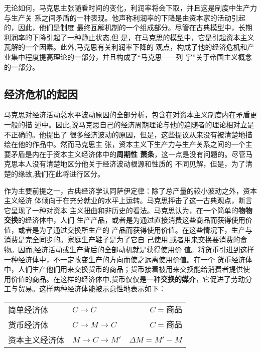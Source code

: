 无论如何，马克思主张随看时间的变化，利润率将会下取，并且这是制度中生产力与生产关
系之间矛盾的一种表现。他声称利润率的下降是由资本家的活动引起的，因此，他们是制度
最终瓦解机制的一个组成部分。尽管在古典模型中，长期利润率的下降引起了一种静止状态,但
是，在马克思的模型中，它是引起资本主义瓦解的一个因素。此外,马克思有关利润率下降的
观点，构成了他的经济危机和产业集中程度提高理论的一部分，并且构成了“马克思——列
宁”关于帝国主义概念的一部分。

\subsection{经济危机的起因}

马克思对经济活动总水平波动原因的全部分析，包含在对资本主义制度内在矛盾更一般的描
述中。因此,说马克思自己的经济周期理论与他的追随者的理论相对立是不正确的。他提出了
很多经济波动的原因，但是，这些提议从来没有被清楚地描绘在他的作品中。然而马克思主
张，资本主义下生产力与生产关系之间的一个主要矛盾是内在于资本主义经济体中的\textbf{周期性
萧条}，这一点是没有问题的。尽管马克思本人没有清楚地区分他关于经济波动根源和性质的
不同见解，但是，为了清楚的缘故,我们在此将进行区分。

作为主要前提之一，古典经济学认同萨伊定律：除了总产量的较小波动之外，资本主义经济
体倾向于在充分就业的水平上运转。马克思抨击了这一古典观点，断言它呈现了一种对资本
主义扭曲和非历史的看法。马克思认为，在一个简单的\textbf{物物交换}的经济体中，人们
生产产品，或者是为通过直接消费这些商品而获得使用价值，或者是为了通过交换所生产的
产品而获得使用价值。在这些情况下，生产与消费是完全同步的。家庭生产鞋子是为了它自
己使用,或者用来交换要消费的食物。因而,经济活动或生产背后的全部动机就是获得使用价
值。将货币引进到这样一种经济体中，不一定改变生产的方向而使之远离使用价值。在一个
货币经济体中，人们生产他们用来交换货币的商品；货币接着被用来交换能给消费者提供使
用价值的商品。在这样的经济体中,货币仅仅是一种\textbf{交换的媒介}，它促进了劳动分
工与贸易。这样两种经济体能被示意性地表示如下：

\begin{table}[htbp]
  \centering
    \begin{tabular}{@{}llr@{}}
     简单经济体 &  $C \rightarrow C$ & $C=商品$ \\
     货币经济体 &  $C \rightarrow M \rightarrow C$ & $C=商品$ \\
     资本主义经济体 &  $ M \rightarrow C \rightarrow M'$ & $\Delta M = M' - M$
    \end{tabular}%
\end{table}

